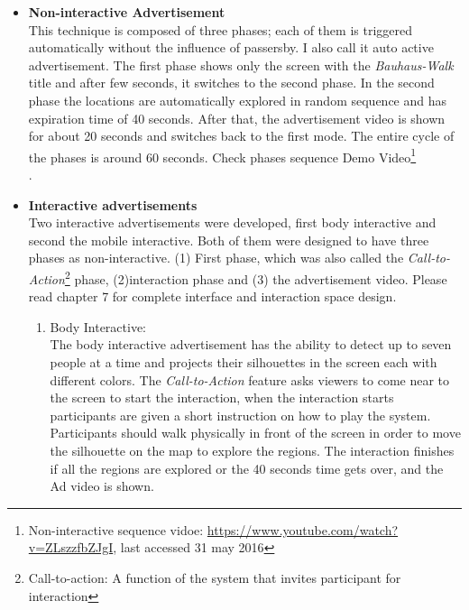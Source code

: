 \begin{itemize}
\item \textbf{Non-interactive Advertisement} \\
This technique is composed of three phases; each of them is triggered automatically without the influence of passersby. I also call it auto active advertisement. The first phase shows only the screen with the \emph{Bauhaus-Walk} title and after few seconds, it switches to the second phase. In the second phase the locations are automatically explored in random sequence and has expiration time of 40 seconds. After that, the advertisement video is shown for about 20 seconds and switches back to the first mode. The entire cycle of the phases is around 60 seconds. Check phases sequence Demo Video\footnote{Non-interactive sequence vidoe: \url{https://www.youtube.com/watch?v=ZLszzfbZJgI}, last accessed 31 may 2016} \\.


\item \textbf{Interactive advertisements} \\
Two interactive advertisements were developed, first body interactive and second the mobile interactive. Both of them were designed to have three phases as non-interactive. (1) First phase, which was also called the \emph{Call-to-Action}\footnote{Call-to-action: A function of the system that invites participant for interaction} phase, (2)interaction phase and (3) the advertisement video. Please read chapter 7 for complete interface and interaction space design.

\begin{enumerate}

\item Body Interactive: \\
The body interactive advertisement has the ability to detect up to seven people at a time and projects their silhouettes in the screen each with different colors. The \emph{Call-to-Action} feature asks viewers to come near to the screen to start the interaction, when the interaction starts participants are given a short instruction on how to play the system. Participants should walk physically in front of the screen in order to move the silhouette on the map to explore the regions. The interaction finishes if all the regions are explored or the 40 seconds time gets over, and the Ad video is shown.


\end{enumerate}
\end{itemize}
